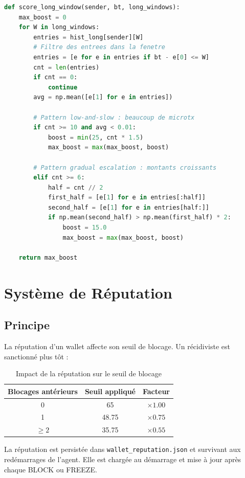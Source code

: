 \documentclass[12pt,a4paper]{report}
\newcommand{\code}[1]{\texttt{#1}}
\begin{document}
\begin{lstlisting}[language=Python, caption={Boost long-window}, label={lst:long_window}]
def score_long_window(sender, bt, long_windows):
    max_boost = 0
    for W in long_windows:
        entries = hist_long[sender][W]
        # Filtre des entrees dans la fenetre
        entries = [e for e in entries if bt - e[0] <= W]
        cnt = len(entries)
        if cnt == 0:
            continue
        avg = np.mean([e[1] for e in entries])

        # Pattern low-and-slow : beaucoup de microtx
        if cnt >= 10 and avg < 0.01:
            boost = min(25, cnt * 1.5)
            max_boost = max(max_boost, boost)

        # Pattern gradual escalation : montants croissants
        elif cnt >= 6:
            half = cnt // 2
            first_half = [e[1] for e in entries[:half]]
            second_half = [e[1] for e in entries[half:]]
            if np.mean(second_half) > np.mean(first_half) * 2:
                boost = 15.0
                max_boost = max(max_boost, boost)

    return max_boost
\end{lstlisting}

\section{Système de Réputation}

\subsection{Principe}

La réputation d'un wallet affecte son seuil de blocage. Un récidiviste est sanctionné plus tôt :

\begin{table}[H]
\centering
\caption{Impact de la réputation sur le seuil de blocage}
\label{tab:reputation}
\begin{tabular}{ccc}
\toprule
\textbf{Blocages antérieurs} & \textbf{Seuil appliqué} & \textbf{Facteur} \\
\midrule
0 & 65 & $\times 1.00$ \\
1 & 48.75 & $\times 0.75$ \\
$\geq 2$ & 35.75 & $\times 0.55$ \\
\bottomrule
\end{tabular}
\end{table}

La réputation est persistée dans \code{wallet\_reputation.json} et survivant aux redémarrages de l'agent. Elle est chargée au démarrage et mise à jour après chaque BLOCK ou FREEZE.
\end{document}
